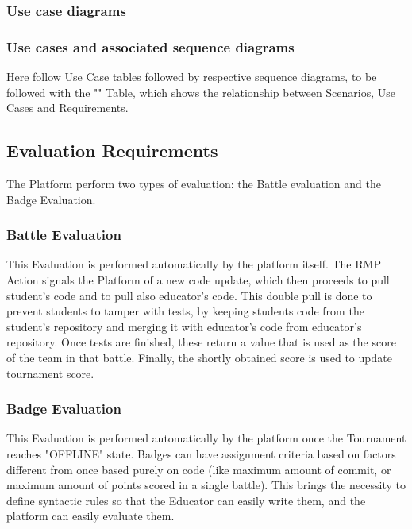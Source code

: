 \newpage

\subsubsection{Use case diagrams}

\newpage

\subsubsection{Use cases and associated sequence diagrams}
Here follow Use Case tables followed by respective sequence diagrams, to be followed with the "" Table, which shows the relationship between Scenarios, Use Cases and Requirements.

\subsection{Evaluation Requirements} \label{req:eval}
The Platform perform two types of evaluation: the Battle evaluation and the Badge Evaluation. 
\subsubsection{Battle Evaluation}
This Evaluation is performed automatically by the platform itself.
The RMP Action signals the Platform of a new code update, which then proceeds to pull student's code and to pull also educator's code. This double pull is done to prevent students to tamper with tests, by keeping students code from the student's repository and merging it with educator's code from educator's repository.
Once tests are finished, these return a value that is used as the score of the team in that battle. Finally, the shortly obtained score is used to update tournament score.
\subsubsection{Badge Evaluation}
This Evaluation is performed automatically by the platform once the Tournament reaches "OFFLINE" state. 
Badges can have assignment criteria based on factors different from once based purely on code (like maximum amount of commit, or maximum amount of points scored in a single battle).
This brings the necessity to define syntactic rules so that the Educator can easily write them, and the platform can easily evaluate them.

